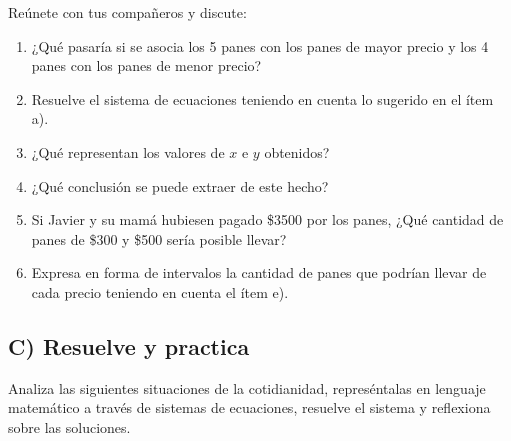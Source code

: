 \documentclass[12pt,a4paper]{article}
\begin{document}
\begin{tcolorbox}[colback=fondoverde,colframe=verdeclaro,title=PROYECTO GRUPAL - APLIQUEMOS LO APRENDIDO]

Reúnete con tus compañeros y discute:

\begin{enumerate}[label=\alph*)]
    \item ¿Qué pasaría si se asocia los 5 panes con los panes de mayor precio y los 4 panes con los panes de menor precio?
    \item Resuelve el sistema de ecuaciones teniendo en cuenta lo sugerido en el ítem a).
    \item ¿Qué representan los valores de $x$ e $y$ obtenidos?
    \item ¿Qué conclusión se puede extraer de este hecho?
    \item Si Javier y su mamá hubiesen pagado \$3500 por los panes, ¿Qué cantidad de panes de \$300 y \$500 sería posible llevar?
    \item Expresa en forma de intervalos la cantidad de panes que podrían llevar de cada precio teniendo en cuenta el ítem e).
\end{enumerate}

\end{tcolorbox}

\vspace{1.5cm}

\subsection*{C) Resuelve y practica}

Analiza las siguientes situaciones de la cotidianidad, represéntalas en lenguaje matemático a través de sistemas de ecuaciones, resuelve el sistema y reflexiona sobre las soluciones.
\end{document}
